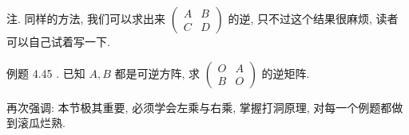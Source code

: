 \documentclass{article}
\begin{document}
{\heiti 注.} 同样的方法, 我们可以求出来 $\left(\begin{array}{cc}A & B \\ C & D\end{array}\right)$ 的逆, 只不过这个结果很麻烦, 读者可以自己试着写一下.

{\heiti 例题 4.45 .} {\kaishu 已知 $A, B$ 都是可逆方阵, 求 $\left(\begin{array}{cc}O & A \\ B & O\end{array}\right)$ 的逆矩阵.}

\vspace{1ex}
再次强调: 本节{\heiti 极其重要,} 必须学会左乘与右乘, 掌握打洞原理, 对每一个例题都做到滚瓜烂熟.
\end{document}
